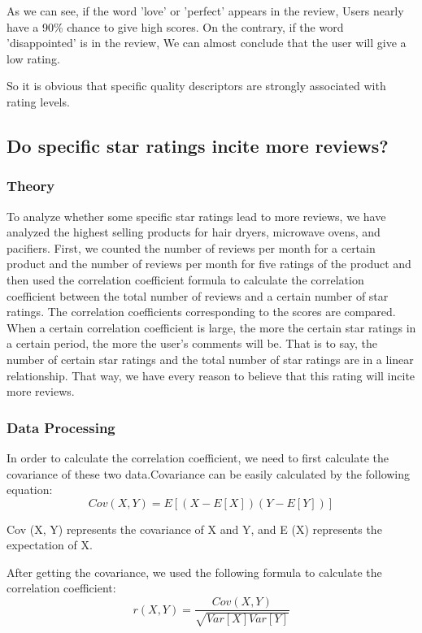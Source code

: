 \documentclass{mcmthesis}
\begin{document}
		As we can see, if the word 'love' or 'perfect' appears in the review, Users nearly have a 90\% chance to give high scores. On the contrary, if the word 'disappointed' is in the review, We can almost conclude that the user will give a low rating.

	So it is obvious that specific quality descriptors are strongly associated with rating levels.
	
	\subsection{Do specific star ratings incite more reviews? }
	\subsubsection{Theory}
	
	To analyze whether some specific star ratings lead to more reviews, we have analyzed the highest selling products for hair dryers, microwave ovens, and pacifiers. First, we counted the number of reviews per month for a certain product and the number of reviews per month for five ratings of the product and then used the correlation coefficient formula to calculate the correlation coefficient between the total number of reviews and a certain number of star ratings. The correlation coefficients corresponding to the scores are compared. When a certain correlation coefficient is large, the more the certain star ratings in a certain period, the more the user's comments will be. That is to say, the number of certain star ratings and the total number of star ratings are in a linear relationship. That way, we have every reason to believe that this rating will incite more reviews.
	
	\subsubsection{Data Processing}
	
	In order to calculate the correlation coefficient, we need to first calculate the covariance of these two data.Covariance can be easily calculated by the following equation:
	$$Cov(X,Y)=E[(X-E[X])(Y-E[Y])]$$
	
	Cov (X, Y) represents the covariance of X and Y, and E (X) represents the expectation of X.
	
	After getting the covariance, we used the following formula to calculate the correlation coefficient:
	$$r(X,Y)=\frac{Cov(X,Y)}{\sqrt{Var[X]Var[Y]}}$$
	
\end{document}
